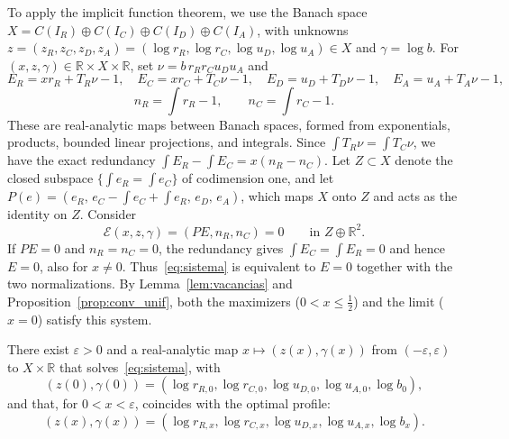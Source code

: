To apply the implicit function theorem, we use the Banach space $X=C(I_R)\oplus C(I_C)\oplus C(I_D)\oplus C(I_A)$, with unknowns
$z=(z_R,z_C,z_D,z_A)=(\log r_R,\log r_C,\log u_D,\log u_A)\in X$ and $\gamma=\log b$. For $(x,z,\gamma)\in\mathbb R\times
X\times\mathbb R$, set $\nu=b\,r_Rr_Cu_Du_A$ and \[
 E_R=xr_R+T_R\nu-1,\quad E_C=xr_C+T_C\nu-1,\quad E_D=u_D+T_D\nu-1,\quad E_A=u_A+T_A\nu-1,
\] \[
 n_R=\int r_R-1,\qquad n_C=\int r_C-1 .
\] These are real-analytic maps between Banach spaces, formed from exponentials, products, bounded linear projections, and integrals.
Since $\int T_R\nu=\int T_C\nu$, we have the exact redundancy $\int E_R-\int E_C=x(n_R-n_C)$. Let $Z\subset X$ denote the closed
subspace $\{\int e_R=\int e_C\}$ of codimension one, and let $P(e)=(e_R,\,e_C-\int e_C+\int e_R,\,e_D,\,e_A)$, which maps $X$ onto $Z$
and acts as the identity on $Z$. Consider \begin{equation}\label{eq:sistema}
 \mathscr E(x,z,\gamma)=(PE,n_R,n_C)=0\qquad\text{in }Z\oplus\mathbb R^2 .
\end{equation} If $PE=0$ and $n_R=n_C=0$, the redundancy gives $\int E_C=\int E_R=0$ and hence $E=0$, also for $x\ne0$.
Thus~\eqref{eq:sistema} is equivalent to $E=0$ together with the two normalizations. By Lemma~\ref{lem:vacancias} and
Proposition~\ref{prop:conv_unif}, both the maximizers ($0<x\le\frac12$) and the limit ($x=0$) satisfy this system.

\begin{teorema}\label{thm:rama} There exist $\varepsilon>0$ and a real-analytic map
$x\mapsto(z(x),\gamma(x))$ from $(-\varepsilon,\varepsilon)$ to $X\times\mathbb R$ that solves~\eqref{eq:sistema}, with \[
 (z(0),\gamma(0))=(\log r_{R,0},\log r_{C,0},\log u_{D,0},\log u_{A,0},\log b_0),
\] and that, for $0<x<\varepsilon$, coincides with the optimal profile: \[
 (z(x),\gamma(x))=(\log r_{R,x},\log r_{C,x},\log u_{D,x},\log u_{A,x},\log b_x).
\] \end{teorema}

